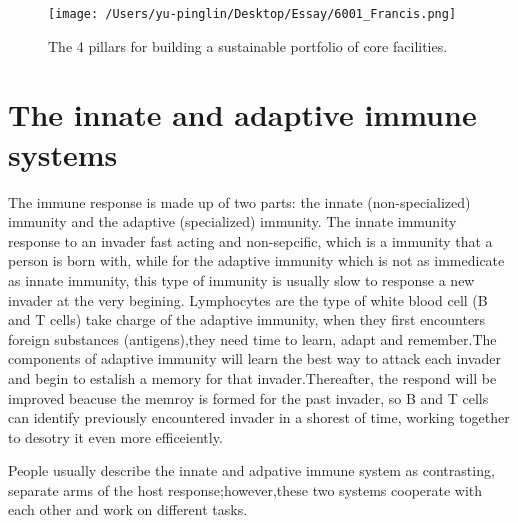 \documentclass[12pt]{article}
\begin{document}
 \begin{figure}[H]
    \texttt{[image: /Users/yu-pinglin/Desktop/Essay/6001\_Francis.png]}
    \centering
    \caption{The 4 pillars for building a sustainable portfolio of
    core facilities.}
\end{figure}

\section{The innate and adaptive immune systems}
The immune response is made up of  two parts: the innate (non-specialized) immunity and the adaptive (specialized) immunity. The innate immunity response to an invader fast acting and non-sepcific, which is a immunity that a person is born with, while for the adaptive immunity which is not as immedicate as innate immunity, this type of immunity is usually slow to response a new invader at the very begining. Lymphocytes are the type of white blood cell (B and T cells) take charge of the adaptive immunity, when they first encounters foreign substances (antigens),they need time to learn, adapt and remember.The components of adaptive immunity will learn the best way to attack each invader and begin to estalish a memory for that invader.Thereafter, the respond will be improved beacuse the memroy is formed for the past invader, so B and T cells can identify previously encountered invader in a shorest of time, working together to desotry it even more efficeiently. \medskip

People usually describe the innate and adpative immune system as contrasting, separate arms of the host response;however,these two systems cooperate with each other and work on different tasks.
\end{document}
